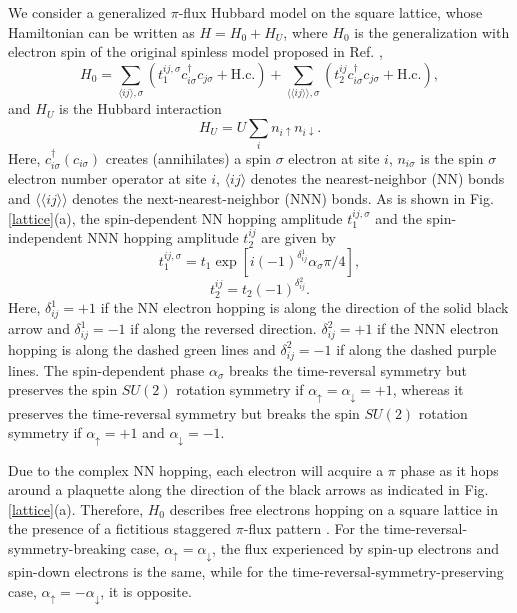 \documentclass[amsmath,superscriptaddress,showpacs,aps,prb,twocolumn]{revtex4-1}
\begin{document}
\par We consider a generalized $\pi$-flux Hubbard model on the square lattice, whose Hamiltonian can be written as $H=H_0+H_U$, where $H_0$ is the generalization with electron spin of the original spinless model proposed in Ref. \cite{NSCM_PRL2011},
\begin{equation}
H_0=\sum_{\langle ij\rangle,\sigma}(t_1^{ij,\sigma}c_{i\sigma}^\dagger c_{j\sigma}+\text{H.c.})
    +\sum_{\langle\langle ij\rangle\rangle,\sigma}(t_2^{ij}c_{i\sigma}^\dagger c_{j\sigma}+\text{H.c.}),
\end{equation}
and $H_U$ is the Hubbard interaction
\begin{equation}
H_U=U\sum_{i}n_{i\uparrow}n_{i\downarrow}.
\end{equation}
Here, $c_{i\sigma}^{\dagger}(c_{i\sigma})$ creates (annihilates) a spin $\sigma$ electron at site $i$, $n_{i\sigma}$ is the spin $\sigma$ electron number operator at site $i$, $\langle ij\rangle$ denotes the nearest-neighbor (NN) bonds and $\langle\langle ij\rangle\rangle$ denotes the next-nearest-neighbor (NNN) bonds. As is shown in Fig. \ref{lattice}(a), the spin-dependent NN hopping amplitude $t_1^{ij,\sigma}$ and the spin-independent NNN hopping amplitude $t_2^{ij}$ are given by
\begin{equation}
t_1^{ij,\sigma}=t_1\exp\left[i(-1)^{\delta^1_{ij}}\alpha_\sigma\pi/4\right],
\end{equation}
\begin{equation}
t_2^{ij}=t_2(-1)^{\delta^2_{ij}}.
\end{equation}
Here, $\delta^1_{ij}=+1$ if the NN electron hopping is along the direction of the solid black arrow and $\delta^1_{ij}=-1$ if along the reversed direction. $\delta^2_{ij}=+1$ if the NNN electron hopping is along the dashed green lines and $\delta^2_{ij}=-1$ if along the dashed purple lines. The spin-dependent phase $\alpha_\sigma$ breaks the time-reversal symmetry but preserves the spin $SU(2)$ rotation symmetry if $\alpha_\uparrow=\alpha_\downarrow=+1$, whereas it preserves the time-reversal symmetry but breaks the spin $SU(2)$ rotation symmetry if $\alpha_\uparrow=+1$ and $\alpha_\downarrow=-1$.

\par Due to the complex NN hopping, each electron will acquire a $\pi$ phase as it hops around a plaquette along the direction of the black arrows as indicated in Fig. \ref{lattice}(a). Therefore, $H_0$ describes free electrons hopping on a square lattice in the presence of a fictitious staggered $\pi$-flux pattern \cite{WWZ_PRB1989}. For the time-reversal-symmetry-breaking case, $\alpha_\uparrow=\alpha_\downarrow$, the flux experienced by spin-up electrons and spin-down electrons is the same, while for the time-reversal-symmetry-preserving case, $\alpha_\uparrow=-\alpha_\downarrow$, it is opposite.
\end{document}
